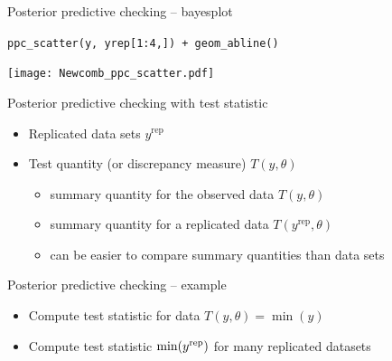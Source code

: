 \documentclass[t]{beamer}
\DeclareMathOperator{\rep}{\mathrm{rep}}
\begin{document}
\begin{frame}{Posterior predictive checking -- bayesplot}

  \vspace{-1\baselineskip}
  \texttt{ppc\_scatter(y, yrep[1:4,]) + geom\_abline()}
  
  \texttt{[image: Newcomb\_ppc\_scatter.pdf]}

\end{frame}

\begin{frame}{Posterior predictive checking with test statistic}

  \begin{itemize}
  \item Replicated data sets $y^{\rep}$
  \item Test quantity (or discrepancy measure) $T(y,\theta)$
    \begin{itemize}
    \item summary quantity for the observed data $T(y,\theta)$
    \item summary quantity for a replicated data $T(y^{\rep},\theta)$
    \item can be easier to compare summary quantities than data sets
    \end{itemize}
  \end{itemize}

\end{frame}

\begin{frame}{Posterior predictive checking -- example}

  \begin{itemize}
  \item<1-> Compute test statistic for data $T(y,\theta)=\min(y)$
  \item<2-> Compute test statistic $\min(y^{\rm rep})$ for many replicated datasets 
  \end{itemize}
  \vspace{-1.5\baselineskip}

\end{frame}
\end{document}
